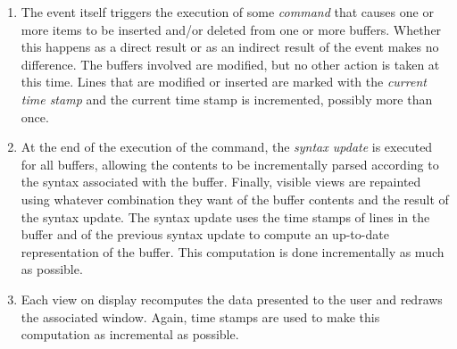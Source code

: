 \begin{enumerate}
\item The event itself triggers the execution of some \emph{command}
  that causes one or more items to be inserted and/or deleted from one
  or more buffers.  Whether this happens as a direct result or as an
  indirect result of the event makes no difference.  The buffers
  involved are modified, but no other action is taken at this time.
  Lines that are modified or inserted are marked with the
  \emph{current time stamp} and the current time stamp is
  incremented, possibly more than once. 
\item At the end of the execution of the command, the \emph{syntax
  update} is executed for all buffers, allowing the contents to be
  incrementally parsed according to the syntax associated with the
  buffer.  Finally, visible views are repainted using whatever
  combination they want of the buffer contents and the result of the
  syntax update.  The syntax update uses the time stamps of lines in
  the buffer and of the previous syntax update to compute an
  up-to-date representation of the buffer.  This computation is done
  incrementally as much as possible.
\item Each view on display recomputes the data presented to the user
  and redraws the associated window.  Again, time stamps are used to
  make this computation as incremental as possible.
\end{enumerate}
